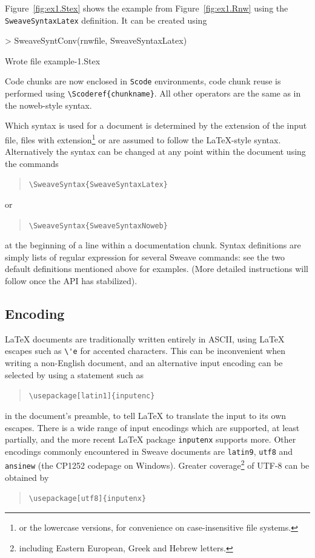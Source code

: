 \documentclass[a4paper]{article}
\begin{document}
Figure~\ref{fig:ex1.Stex} shows the example from
Figure~\ref{fig:ex1.Rnw} using the \texttt{SweaveSyntaxLatex}
definition. It can be created using
\begin{Schunk}
\begin{Sinput}
> SweaveSyntConv(rnwfile, SweaveSyntaxLatex)
\end{Sinput}
\begin{Soutput}
Wrote file example-1.Stex 
\end{Soutput}
\end{Schunk}

Code chunks are now enclosed in \texttt{Scode}
environments, code chunk reuse is performed using
\verb|\Scoderef{chunkname}|. All other operators are the same as in
the noweb-style syntax.

Which syntax is used for a document is determined by the extension of
the input file, files with extension\footnote{or the lowercase
  versions, for convenience on case-insensitive file systems.}
 or  are assumed to follow the
\LaTeX-style syntax. Alternatively the syntax can be changed at any
point within the document using the commands
\begin{quote}
  \verb|\SweaveSyntax{SweaveSyntaxLatex}|
\end{quote}
or
\begin{quote}
  \verb|\SweaveSyntax{SweaveSyntaxNoweb}|
\end{quote}
at the beginning of a line within a documentation chunk. Syntax
definitions are simply lists of regular expression for several Sweave
commands: see the two default definitions mentioned above for
examples.  (More detailed instructions will follow once the API has
stabilized).

\subsection{Encoding}

\LaTeX{} documents are traditionally written entirely in ASCII, using
\LaTeX{} escapes such as \verb|\'e| for accented characters.  This
can be inconvenient when writing a non-English document, and an
alternative input encoding can be selected by using a statement such as
\begin{quote}
  \verb|\usepackage[latin1]{inputenc}|
\end{quote}
in the document's preamble, to tell \LaTeX{} to translate the input to
its own escapes.  There is a wide range of input encodings which are
supported, at least partially, and the more recent \LaTeX{} package
\texttt{inputenx} supports more.  Other encodings commonly encountered
in Sweave documents are \texttt{latin9}, \texttt{utf8} and
\texttt{ansinew} (the CP1252 codepage on Windows).  Greater
coverage\footnote{including Eastern European, Greek and Hebrew
  letters.}  of UTF-8 can be obtained by
\begin{quote}
  \verb|\usepackage[utf8]{inputenx}|
  \verb||
\end{quote}
\end{document}
